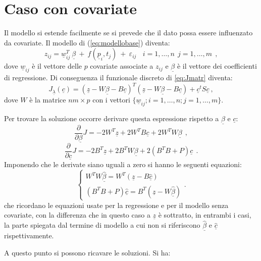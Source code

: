 \documentclass[a4paper,11pt,twoside,openright]{book}							%
\begin{document}
\section{Caso con covariate}

Il modello si estende facilmente se si prevede che il dato possa essere influenzato da covariate. Il modello di (\ref{eq:modellobase}) diventa:
\begin{equation}
\label{eq:modellobasecovar}
z_{ij}= \underline w_{ij}^T\  \underline \beta   \ + \  f(\underline p_i,t_j)\ +\ \varepsilon_{ij}\ \ \ \ i = 1,\ldots,n\ \ j=1,\ldots,m \ \ ,
\end{equation}
dove $\underline w_{ij}$ è il vettore delle $p$ covariate associate a $z_{ij}$ e $\underline \beta$ è il vettore dei coefficienti di regressione. Di conseguenza il funzionale discreto di \ref{eq:Jmatr} diventa:
$$ J_{\underline \lambda }(\underline c) = (\underline z - W \underline \beta - B \underline c)^T (\underline z - W \underline \beta - B \underline c) + \underline c^t S \underline c  \ ,$$
dove $W$ è la matrice $nm \times p$ con i vettori $ \{\underline w_{ij}; i=1,\ldots,n;j=1,\ldots,m\}$.

Per trovare la soluzione occorre derivare questa espressione rispetto a $\underline \beta$ e $\underline c$:
$$
\frac{\partial}{\partial \underline \beta}J= -2W^T \underline z + 2W^T B \underline c + 2 W^TW \underline \beta \ \ ,
$$
$$
\frac{\partial}{\partial \underline c}J= -2 B^T \underline z + 2 B^T W \underline \beta + 2(B^T B + P) \underline c \ \ .
$$
Imponendo che le derivate siano uguali a zero si hanno le seguenti equazioni:
$$
\begin{cases}
W^TW \hat{\underline \beta} = W^T(\underline z - B \hat{\underline c})  \\
(B^T B + P) \hat{\underline c}=B^T(\underline z -W \hat{\underline \beta})
\end{cases}.
$$
che ricordano le equazioni usate per la regressione e per il modello senza covariate, con la differenza che in questo caso a $\underline z$ è sottratto, in entrambi i casi, la parte spiegata dal termine di modello a cui non si riferiscono $\hat{\underline \beta}$ e $\hat{\underline c}$ rispettivamente.

A questo punto si possono ricavare le soluzioni. Si ha:
\end{document}
